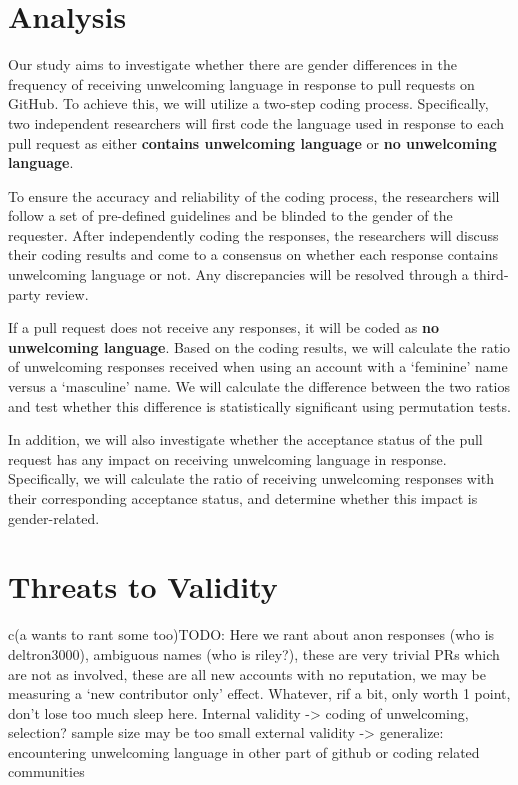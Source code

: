 \documentclass[journal,12pt,onecolumn,]{IEEEtran}
\begin{document}
\section{Analysis}

Our study aims to investigate whether there are gender differences in the frequency of receiving unwelcoming language in response to pull requests on GitHub.
To achieve this, we will utilize a two-step coding process.
Specifically, two independent researchers will first code the language used in response to each pull request as either \textbf{contains unwelcoming language} or \textbf{no unwelcoming language}.

To ensure the accuracy and reliability of the coding process, the researchers will follow a set of pre-defined guidelines and be blinded to the gender of the requester.
After independently coding the responses, the researchers will discuss their coding results and come to a consensus on whether each response contains unwelcoming language or not.
Any discrepancies will be resolved through a third-party review.

If a pull request does not receive any responses, it will be coded as \textbf{no unwelcoming language}.
Based on the coding results, we will calculate the ratio of unwelcoming responses received when using an account with a `feminine' name versus a `masculine' name.
We will calculate the difference between the two ratios and test whether this difference is statistically significant using permutation tests.

In addition, we will also investigate whether the acceptance status of the pull request has any impact on receiving unwelcoming language in response.
Specifically, we will calculate the ratio of receiving unwelcoming responses with their corresponding acceptance status, and determine whether this impact is gender-related.


\section{Threats to Validity}

c(a wants to rant some too)TODO: Here we rant about anon responses (who is deltron3000), ambiguous names (who is riley?), these are very trivial PRs which are not as involved, these are all new accounts with no reputation, we may be measuring a `new contributor only' effect.  Whatever, rif a bit, only worth 1 point, don't lose too much sleep here.
Internal validity -> coding of unwelcoming, selection? sample size may be too small
external validity -> generalize: encountering unwelcoming language in other part of github or coding related communities
\end{document}
